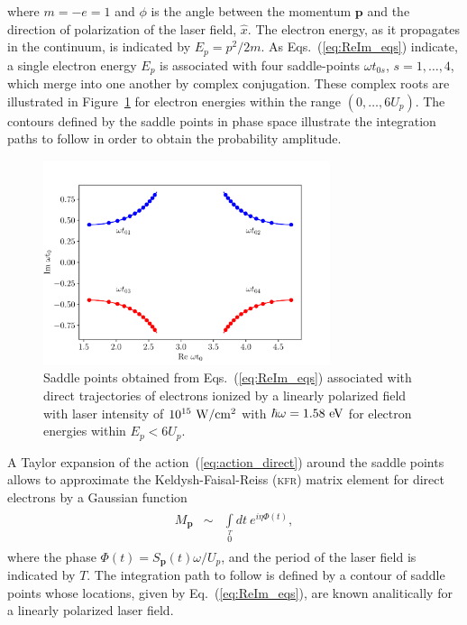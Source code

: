 %
where $m = -e = 1$ and $\phi$ is the angle between the momentum
$\mathbf{p}$ and the direction of polarization of the laser field,
$\hat{x}$. The electron energy, as it propagates in the continuum, is
indicated by $E_{p} = p^{2}/2m$. As Eqs.~(\ref{eq:ReIm_eqs}) indicate,
a single electron energy $E_{p}$ is associated with four saddle-points
$\omega t_{0s}$, $s = 1, \dots, 4$, which merge into one another by
complex conjugation. These complex roots are illustrated in
Figure~\ref{fig:sp_direct} for electron energies within the range $(0,
\dots, 6U_{p})$. The contours defined by the saddle points in phase
space illustrate the integration paths to follow in order to obtain
the probability amplitude.

\begin{figure}
  \centering
  \includegraphics[width = 0.75\textwidth]{figures/ch_ATI_SPA/direct/spDirectElectrons}
  \caption{Saddle points obtained from Eqs.~(\ref{eq:ReIm_eqs})
    associated with direct trajectories of electrons ionized by a
    linearly polarized field with laser intensity of
    $10^{15}\ \rm{W/cm^{2}}$ with $\hbar\omega = 1.58\ \rm{eV}$ for
    electron energies within $E_{p} < 6 U_{p}$.}
  \label{fig:sp_direct}
\end{figure}

A Taylor expansion of the action~(\ref{eq:action_direct}) around the
saddle points allows to approximate the Keldysh-Faisal-Reiss
(\textsc{kfr}) matrix element for direct electrons by a Gaussian
function~\cite{phd_Kopold}
%
\begin{eqnarray}
  \label{eq:KFR_Mp}
  \begin{split}
    M_{\mathbf{p}} & \sim & \int\limits_{0}\limits^{T} dt\ e^{i \eta \Phi(t)},
  \end{split}
\end{eqnarray}
%
where the phase $\Phi(t) = S_{\mathbf{p}}(t)\omega / U_{p}$, and the
period of the laser field is indicated by $T$. The integration path to
follow is defined by a contour of saddle points whose locations, given
by Eq.~(\ref{eq:ReIm_eqs}), are known analitically for a linearly
polarized laser field.

